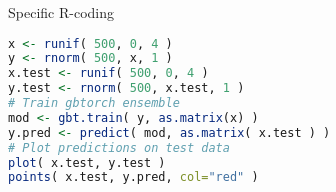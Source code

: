 \begin{frame}[fragile]{Specific R-coding}
\begin{lstlisting}[language=R]
x <- runif( 500, 0, 4 )
y <- rnorm( 500, x, 1 )
x.test <- runif( 500, 0, 4 )
y.test <- rnorm( 500, x.test, 1 )
# Train gbtorch ensemble
mod <- gbt.train( y, as.matrix(x) )
y.pred <- predict( mod, as.matrix( x.test ) )
# Plot predictions on test data
plot( x.test, y.test )
points( x.test, y.pred, col="red" )
\end{lstlisting}
\end{frame}